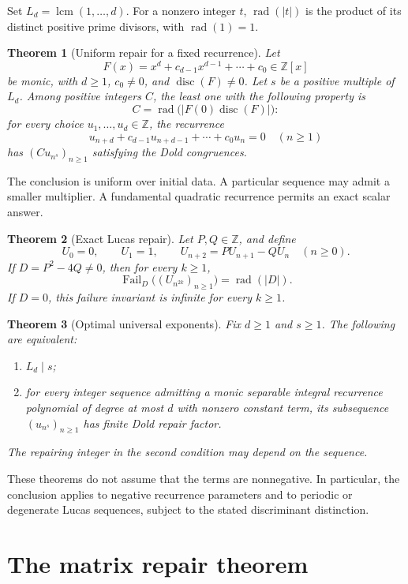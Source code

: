 \documentclass[11pt]{article}
\newtheorem{theorem}{Theorem}
\theoremstyle{remark}
\newcommand{\rad}{\operatorname{rad}}
\newcommand{\disc}{\operatorname{disc}}
\newcommand{\Fail}{\operatorname{Fail}_{D}}
\newcommand{\lcm}{\operatorname{lcm}}
\begin{document}
Set $L_d=\lcm(1,\ldots,d)$. For a nonzero integer $t$, $\rad(|t|)$ is the product of its distinct positive prime divisors, with $\rad(1)=1$.

\begin{theorem}[Uniform repair for a fixed recurrence]\label{thm:recurrence}
Let
\[
 F(x)=x^d+c_{d-1}x^{d-1}+\cdots+c_0\in\mathbb Z[x]
\]
be monic, with $d\geq1$, $c_0\neq0$, and $\disc(F)\neq0$. Let $s$ be a positive multiple of $L_d$. Among positive integers $C$, the least one with the following property is
\[
 C=\rad\bigl(|F(0)\disc(F)|\bigr):
\]
for every choice $u_1,\ldots,u_d\in\mathbb Z$, the recurrence
\[
 u_{n+d}+c_{d-1}u_{n+d-1}+\cdots+c_0u_n=0\quad(n\geq1)
\]
has $(C u_{n^s})_{n\geq1}$ satisfying the Dold congruences.
\end{theorem}

The conclusion is uniform over initial data. A particular sequence may admit a smaller multiplier. A fundamental quadratic recurrence permits an exact scalar answer.

\begin{theorem}[Exact Lucas repair]\label{thm:lucas}
Let $P,Q\in\mathbb Z$, and define
\[
 U_0=0,\qquad U_1=1,\qquad U_{n+2}=P U_{n+1}-Q U_n\quad(n\geq0).
\]
If $D=P^2-4Q\neq0$, then for every $k\geq1$,
\[
 \Fail\bigl((U_{n^{2k}})_{n\geq1}\bigr)=\rad(|D|).
\]
If $D=0$, this failure invariant is infinite for every $k\geq1$.
\end{theorem}

\begin{theorem}[Optimal universal exponents]\label{thm:optimal-exponent}
Fix $d\geq1$ and $s\geq1$. The following are equivalent:
\begin{enumerate}
\item $L_d\mid s$;
\item for every integer sequence admitting a monic separable integral recurrence polynomial of degree at most $d$ with nonzero constant term, its subsequence $(u_{n^s})_{n\geq1}$ has finite Dold repair factor.
\end{enumerate}
The repairing integer in the second condition may depend on the sequence.
\end{theorem}

These theorems do not assume that the terms are nonnegative. In particular, the conclusion applies to negative recurrence parameters and to periodic or degenerate Lucas sequences, subject to the stated discriminant distinction.

\section{The matrix repair theorem}
\end{document}
